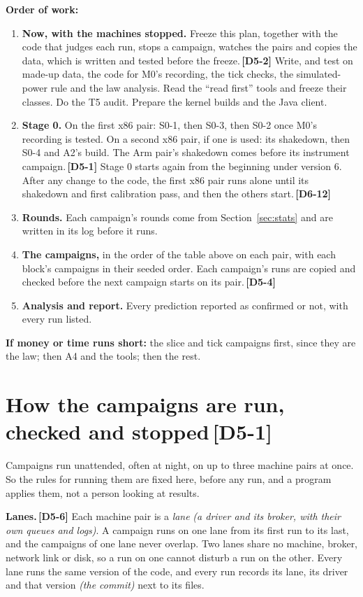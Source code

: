 \documentclass[11pt]{article}
\newcommand{\gl}[1]{{\color{soft}\itshape\small (#1)}}
\newcommand{\chgold}[1]{\,{\color{oldcol}\bfseries\footnotesize[#1]}}
\begin{document}
\textbf{Order of work:}
\begin{enumerate}
  \item \textbf{Now, with the machines stopped.} Freeze this plan, together with the code that judges each run, stops a campaign, watches the pairs and copies the data, which is written and tested before the freeze.\chgold{D5-2} Write, and test on made-up data, the code for M0's recording, the tick checks, the simulated-power rule and the law analysis. Read the ``read first'' tools and freeze their classes. Do the T5 audit. Prepare the kernel builds and the Java client.
  \item \textbf{Stage 0.} On the first x86 pair: S0-1, then S0-3, then S0-2 once M0's recording is tested. On a second x86 pair, if one is used: its shakedown, then S0-4 and A2's build. The Arm pair's shakedown comes before its instrument campaign.\chgold{D5-1} Stage 0 starts again from the beginning under version 6. After any change to the code, the first x86 pair runs alone until its shakedown and first calibration pass, and then the others start.\chgold{D6-12}
  \item \textbf{Rounds.} Each campaign's rounds come from Section~\ref{sec:stats} and are written in its log before it runs.
  \item \textbf{The campaigns,} in the order of the table above on each pair, with each block's campaigns in their seeded order. Each campaign's runs are copied and checked before the next campaign starts on its pair.\chgold{D5-4}
  \item \textbf{Analysis and report.} Every prediction reported as confirmed or not, with every run listed.
\end{enumerate}
\textbf{If money or time runs short:} the slice and tick campaigns first, since they are the law; then A4 and the tools; then the rest.

\section[How the campaigns are run, checked and stopped]{How the campaigns are run, checked and stopped\protect\chgold{D5-1}}\label{sec:operations}
Campaigns run unattended, often at night, on up to three machine pairs at once. So the rules for running them are fixed here, before any run, and a program applies them, not a person looking at results.

\textbf{Lanes.}\chgold{D5-6} Each machine pair is a \emph{lane} \gl{a driver and its broker, with their own queues and logs}. A campaign runs on one lane from its first run to its last, and the campaigns of one lane never overlap. Two lanes share no machine, broker, network link or disk, so a run on one cannot disturb a run on the other. Every lane runs the same version of the code, and every run records its lane, its driver and that version \gl{the commit} next to its files.
\end{document}

